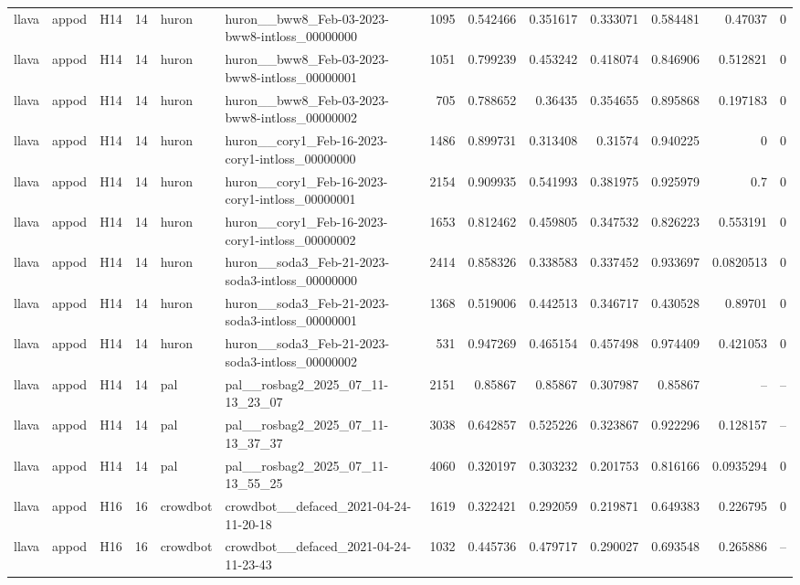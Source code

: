 \begin{longtable}{lllrllrrrrrrr}
llava & appod & H14 & 14 & huron & huron\_\_bww8\_Feb-03-2023-bww8-intloss\_00000000 & 1095 & 0.542466 & 0.351617 & 0.333071 & 0.584481 & 0.47037 & 0 \\
llava & appod & H14 & 14 & huron & huron\_\_bww8\_Feb-03-2023-bww8-intloss\_00000001 & 1051 & 0.799239 & 0.453242 & 0.418074 & 0.846906 & 0.512821 & 0 \\
llava & appod & H14 & 14 & huron & huron\_\_bww8\_Feb-03-2023-bww8-intloss\_00000002 & 705 & 0.788652 & 0.36435 & 0.354655 & 0.895868 & 0.197183 & 0 \\
llava & appod & H14 & 14 & huron & huron\_\_cory1\_Feb-16-2023-cory1-intloss\_00000000 & 1486 & 0.899731 & 0.313408 & 0.31574 & 0.940225 & 0 & 0 \\
llava & appod & H14 & 14 & huron & huron\_\_cory1\_Feb-16-2023-cory1-intloss\_00000001 & 2154 & 0.909935 & 0.541993 & 0.381975 & 0.925979 & 0.7 & 0 \\
llava & appod & H14 & 14 & huron & huron\_\_cory1\_Feb-16-2023-cory1-intloss\_00000002 & 1653 & 0.812462 & 0.459805 & 0.347532 & 0.826223 & 0.553191 & 0 \\
llava & appod & H14 & 14 & huron & huron\_\_soda3\_Feb-21-2023-soda3-intloss\_00000000 & 2414 & 0.858326 & 0.338583 & 0.337452 & 0.933697 & 0.0820513 & 0 \\
llava & appod & H14 & 14 & huron & huron\_\_soda3\_Feb-21-2023-soda3-intloss\_00000001 & 1368 & 0.519006 & 0.442513 & 0.346717 & 0.430528 & 0.89701 & 0 \\
llava & appod & H14 & 14 & huron & huron\_\_soda3\_Feb-21-2023-soda3-intloss\_00000002 & 531 & 0.947269 & 0.465154 & 0.457498 & 0.974409 & 0.421053 & 0 \\
llava & appod & H14 & 14 & pal & pal\_\_rosbag2\_2025\_07\_11-13\_23\_07 & 2151 & 0.85867 & 0.85867 & 0.307987 & 0.85867 & -- & -- \\
llava & appod & H14 & 14 & pal & pal\_\_rosbag2\_2025\_07\_11-13\_37\_37 & 3038 & 0.642857 & 0.525226 & 0.323867 & 0.922296 & 0.128157 & -- \\
llava & appod & H14 & 14 & pal & pal\_\_rosbag2\_2025\_07\_11-13\_55\_25 & 4060 & 0.320197 & 0.303232 & 0.201753 & 0.816166 & 0.0935294 & 0 \\
llava & appod & H16 & 16 & crowdbot & crowdbot\_\_defaced\_2021-04-24-11-20-18 & 1619 & 0.322421 & 0.292059 & 0.219871 & 0.649383 & 0.226795 & 0 \\
llava & appod & H16 & 16 & crowdbot & crowdbot\_\_defaced\_2021-04-24-11-23-43 & 1032 & 0.445736 & 0.479717 & 0.290027 & 0.693548 & 0.265886 & -- \\

\end{longtable}
